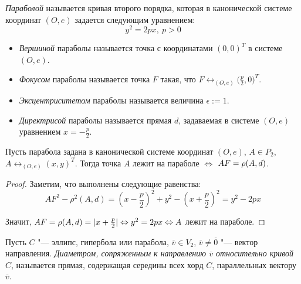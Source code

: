     \begin{definition}
    	\textit{Параболой} называется кривая второго порядка, которая в канонической системе координат $(O, e)$ задается следующим уравнением:
    	\[y^2 = 2px,~p > 0\]
    	
    	\begin{itemize}
    		\item \textit{Вершиной} параболы называется точка с координатами $(0, 0)^T$ в системе $(O, e)$.
    		
    		\item \textit{Фокусом} параболы называется точка $F$ такая, что $F \leftrightarrow_{(O, e)} \big(\frac p2, 0\big)^T$.
    		
    		\item \textit{Эксцентриситетом} параболы называется величина $\epsilon := 1$.
    		
    		\item \textit{Директрисой} параболы называется прямая $d$, задаваемая в системе $(O, e)$ уравнением $x = -\frac{p}{2}$.
    	\end{itemize}
    \end{definition}
    
    \begin{theorem}
    	Пусть парабола задана в канонической системе координат $(O, e)$, $A \in P_2$, $A \leftrightarrow_{(O, e)} (x, y)^T$. Тогда точка $A$ лежит на параболе $\Leftrightarrow$ $AF \hm{=} \rho(A, d)$.
    \end{theorem}
    
    \begin{proof}
    	Заметим, что выполнены следующие равенства:
    	\[AF^2 - \rho^2(A, d) = \left(x - \frac{p}{2}\right)^2 + y^2 - \left(x + \frac{p}{2}\right)^2 = y^2 - 2px\]
    	
    	Значит, $AF = \rho(A, d) = |x + \frac{p}{2}| \Leftrightarrow y^2 = 2px \Leftrightarrow A$ лежит на параболе.
    \end{proof}
    
    \begin{definition}
    	Пусть $C$ "--- эллипс, гипербола или парабола, $\overline{v} \in V_2$, $\overline{v} \ne \overline 0$ "--- вектор направления. \textit{Диаметром, сопряженным к направлению $\overline{v}$ относительно кривой $C$}, называется прямая, содержащая середины всех хорд $C$, параллельных вектору $\overline{v}$.
    \end{definition}
    
